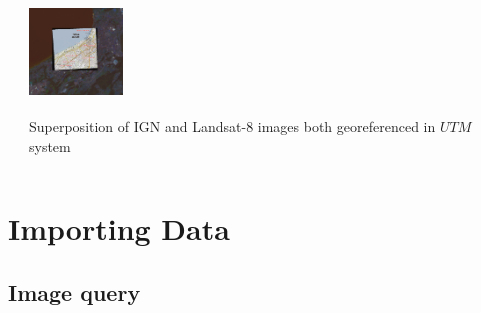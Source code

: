 \documentclass[c]{beamer}
\begin{document}
\begin{frame}
\begin{columns}[t]
\begin{column}{0.30\textwidth}
\end{column}
\begin{column}{0.30\textwidth}
\begin{overlayarea}{\linewidth}{3cm}
  \centering\vfill
  \includegraphics[height=2.5cm,width=2.5cm]{images/georeferencing/qgis-superposition0.png}
\end{overlayarea}
\begin{overlayarea}{\linewidth}{2cm}
  \centering
  \scriptsize Superposition of IGN and Landsat-8 images both georeferenced in $UTM$ system\par
\end{overlayarea}
\end{column}
\end{columns}

\end{frame}

\section{Importing Data}
\begin{frame}
\tableofcontents[currentsection]
\end{frame}

\subsection{Image query}
\begin{frame}
\tableofcontents[currentsubsection]
\end{frame}
\end{document}
